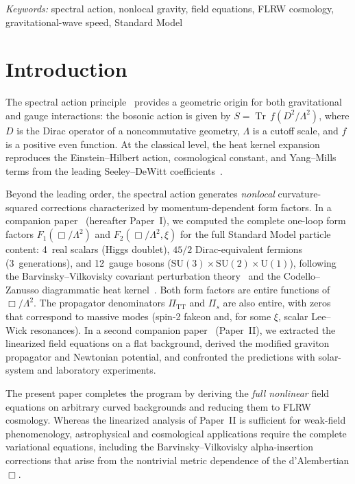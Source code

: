 \documentclass[12pt,a4paper]{article}
\newcommand{\Tr}{\operatorname{Tr}}
\newcommand{\Lam}{\Lambda}
\theoremstyle{plain}
\theoremstyle{definition}
\begin{document}
\vspace{6pt}
\noindent\textit{Keywords:}
spectral action, nonlocal gravity, field equations, FLRW cosmology,
gravitational-wave speed, Standard Model

\tableofcontents

\section{Introduction}
\label{sec:intro}

The spectral action principle~\cite{Chamseddine:1996zu,Chamseddine:2006ep}
provides a geometric origin for both gravitational and gauge interactions:
the bosonic action is given by $S = \Tr\,f(D^2/\Lam^2)$, where $D$ is the
Dirac operator of a noncommutative geometry, $\Lam$ is a cutoff scale, and
$f$ is a positive even function.  At the classical level, the heat kernel
expansion reproduces the Einstein--Hilbert action, cosmological constant, and
Yang--Mills terms from the leading Seeley--DeWitt
coefficients~\cite{Chamseddine:2010ud,vanSuijlekom:2014pya}.

Beyond the leading order, the spectral action generates \emph{nonlocal}
curvature-squared corrections characterized by momentum-dependent form
factors.  In a companion paper~\cite{Alfyorov:2026ff} (hereafter Paper~I),
we computed the complete one-loop form factors $F_1(\Box/\Lam^2)$ and
$F_2(\Box/\Lam^2,\xi)$ for the full Standard Model particle content:
4~real scalars (Higgs doublet), $45/2$ Dirac-equivalent fermions
(3~generations), and 12~gauge bosons
($\mathrm{SU}(3) \times \mathrm{SU}(2) \times \mathrm{U}(1)$),
following the Barvinsky--Vilkovisky covariant perturbation
theory~\cite{Barvinsky:1985an,Barvinsky:1987uw} and the Codello--Zanusso
diagrammatic heat kernel~\cite{Codello:2012kq}.  Both form factors are
entire functions of $\Box/\Lam^2$. The propagator denominators
$\Pi_{\mathrm{TT}}$ and $\Pi_s$ are also entire, with zeros that
correspond to massive modes (spin-2 fakeon and, for some $\xi$,
scalar Lee--Wick resonances).  In a second companion paper~\cite{Alfyorov:2026ss}
(Paper~II), we extracted the linearized field equations on a flat background,
derived the modified graviton propagator and Newtonian potential, and
confronted the predictions with solar-system and laboratory experiments.

The present paper completes the program by deriving the \emph{full nonlinear}
field equations on arbitrary curved backgrounds and reducing them to FLRW
cosmology.  Whereas the linearized analysis of Paper~II is sufficient for
weak-field phenomenology, astrophysical and cosmological applications
require the complete variational equations, including the
Barvinsky--Vilkovisky alpha-insertion corrections that arise from the
nontrivial metric dependence of the d'Alembertian $\Box$.
\end{document}
